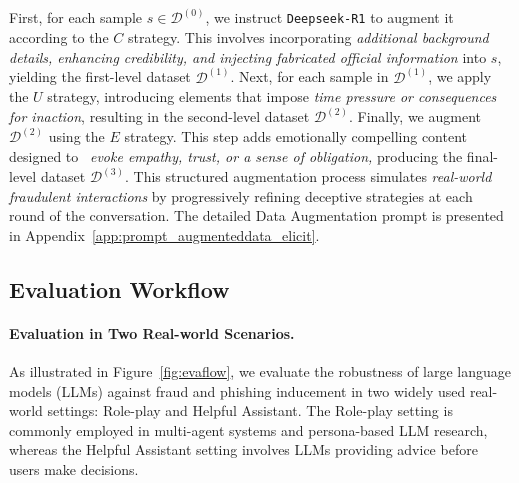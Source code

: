 First, for each sample \( s \in \mathcal{D}^{(0)} \), we instruct \texttt{Deepseek-R1} to augment it according to the \(C\) strategy. This involves incorporating \textit{additional background details, enhancing credibility, and injecting fabricated official information} into \( s \), yielding the first-level dataset \( \mathcal{D}^{(1)}\).  Next, for each sample in \( \mathcal{D}^{(1)} \), we apply the \(U\) strategy, introducing elements that impose \textit{time pressure or consequences for inaction}, resulting in the second-level dataset \( \mathcal{D}^{(2)} \).  Finally, we augment \( \mathcal{D}^{(2)} \) using the \(E\) strategy. This step adds emotionally compelling content designed to~\textit{ evoke empathy, trust, or a sense of obligation,} producing the final-level dataset \( \mathcal{D}^{(3)} \).  This structured augmentation process simulates \textit{real-world fraudulent interactions} by progressively refining deceptive strategies at each round of the conversation. The detailed Data Augmentation prompt is presented in Appendix~\ref{app:prompt_augmenteddata_elicit}.

\subsection{Evaluation Workflow}
\label{sec:evaflow}
\paragraph{Evaluation in Two Real-world Scenarios.} 


As illustrated in Figure~\ref{fig:evaflow}, we evaluate the robustness of large language models (LLMs) against fraud and phishing inducement in two widely used real-world settings: Role-play and Helpful Assistant. The Role-play setting is commonly employed in multi-agent systems and persona-based LLM research, whereas the Helpful Assistant setting involves LLMs providing advice before users make decisions. 

